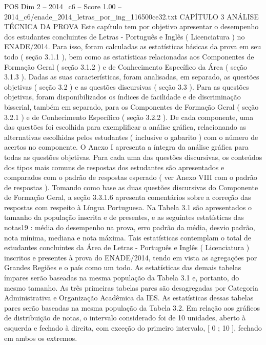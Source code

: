 \begin{textsample}{POS Dim 2 – 2014\_c6 – Score 1.00 – 2014\_c6/enade\_2014\_letras\_por\_ing\_116500ce32.txt}  \label{ex:f2_pos_228}
CAPÍTULO 3 ANÁLISE TÉCNICA DA PROVA Este capítulo tem por objetivo apresentar o desempenho dos estudantes concluintes de Letras - Português e Inglês ( Licenciatura ) no ENADE/2014.
Para isso, foram calculadas as estatísticas básicas da prova em seu todo ( seção 3.1.1 ), bem como as estatísticas relacionadas aos Componentes de Formação Geral ( seção 3.1.2 ) e de Conhecimento Específico da Área ( seção 3.1.3 ).
Dadas as suas características, foram analisadas, em separado, as questões objetivas ( seção 3.2 ) e as questões discursivas ( seção 3.3 ).
Para as questões objetivas, foram disponibilizados os índices de facilidade e de discriminação bisserial, também em separado, para os Componentes de Formação Geral ( seção 3.2.1 ) e de Conhecimento Específico ( seção 3.2.2 ).
De cada componente, uma das questões foi escolhida para exemplificar a análise gráfica, relacionando as alternativas escolhidas pelos estudantes ( inclusive o gabarito ) com o número de acertos no componente.
O Anexo I apresenta a íntegra da análise gráfica para todas as questões objetivas.
Para cada uma das questões discursivas, os conteúdos dos tipos mais comuns de respostas dos estudantes são apresentados e comparados com o padrão de respostas esperado ( ver Anexo VIII com o padrão de respostas ).
Tomando como base as duas questões discursivas do Componente de Formação Geral, a seção 3.3.1.6 apresenta comentários sobre a correção das respostas com respeito à Língua Portuguesa.
Na Tabela 3.1 são apresentados o tamanho da população inscrita e de presentes, e as seguintes estatísticas das notas19 : média do desempenho na prova, erro padrão da média, desvio padrão, nota mínima, mediana e nota máxima.
Tais estatísticas contemplam o total de estudantes concluintes da Área de Letras - Português e Inglês ( Licenciatura ) inscritos e presentes à prova do ENADE/2014, tendo em vista as agregações por Grandes Regiões e o país como um todo.
As estatísticas das demais tabelas ímpares serão baseadas na mesma população da Tabela 3.1 e, portanto, do mesmo tamanho.
As três primeiras tabelas pares são desagregadas por Categoria Administrativa e Organização Acadêmica da IES.
As estatísticas dessas tabelas pares serão baseadas na mesma população da Tabela 3.2.
Em relação aos gráficos de distribuição de notas, o intervalo considerado foi de 10 unidades, aberto à esquerda e fechado à direita, com exceção do primeiro intervalo, [ 0 ; 10 ], fechado em ambos os extremos.

\end{textsample}
